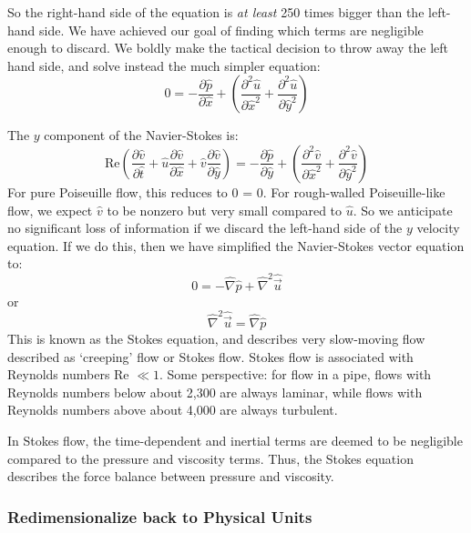 \documentclass[a4paper]{report}
\begin{document}
So the right-hand side of the equation is \emph{at least} 250 times bigger than the left-hand side.  We have achieved our goal of finding which terms are negligible enough to discard.  We boldly make the tactical decision to throw away the left hand side, and solve instead the much simpler equation:
\begin{equation}
0 = -  \frac{\partial \hat{p}}{\partial \hat{x}} + 
\left( \frac{\partial^2 \hat{u}}{\partial \hat{x}^2} + 
\frac{\partial^2 \hat{u}}{\partial \hat{y}^2} \right)
\end{equation}

The $y$ component of the Navier-Stokes is:
\begin{equation}
\mathrm{Re} \left( 
\frac{\partial \hat{v}}{\partial \hat{t}} +
\hat{u} \frac{\partial \hat{v}}{\partial \hat{x}} +
\hat{v} \frac{\partial \hat{v}}{\partial \hat{y}}
 \right) =
    -  \frac{\partial \hat{p}}{\partial \hat{y}} + 
\left( \frac{\partial^2 \hat{v}}{\partial \hat{x}^2} + 
       \frac{\partial^2 \hat{v}}{\partial \hat{y}^2} 
\right)
\end{equation}
For pure Poiseuille flow, this reduces to 0 = 0.  For rough-walled Poiseuille-like flow, we expect $\hat{v}$ to be nonzero but very small compared to $\hat{u}$.  
So we anticipate no significant loss of information if we discard the left-hand side of the $y$ velocity equation.  If we do this, then we have simplified the Navier-Stokes vector equation to:
\begin{equation}
0 = -\hat{\nabla} \hat{p} + \hat{\nabla}^2 \hat{\vec{u}}
\end{equation}
or
\begin{equation}
\hat{\nabla}^2 \hat{\vec{u}} = \hat{\nabla} \hat{p}
\end{equation}
This is known as the Stokes equation, and describes very slow-moving flow described as `creeping' flow or Stokes flow.  Stokes flow is associated with Reynolds numbers Re $ \ll 1$.  Some perspective: for flow in a pipe, flows with Reynolds numbers below about 2,300 are always laminar, while flows with Reynolds numbers above about 4,000 are always turbulent.

In Stokes flow, the time-dependent and inertial terms are deemed to be negligible compared to the pressure and viscosity terms.  Thus, the Stokes equation describes the force balance between pressure and viscosity.

\subsubsection*{Redimensionalize back to Physical Units}
\end{document}
